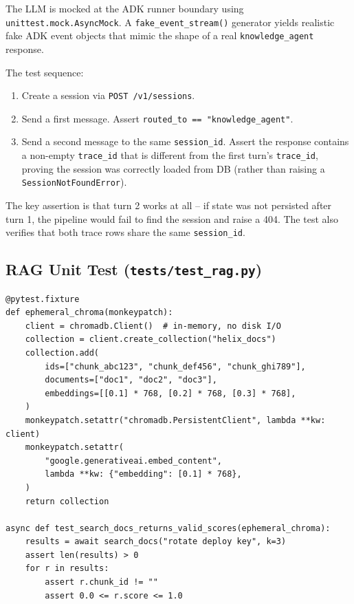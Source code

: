 \documentclass[12pt,a4paper]{article}
\begin{document}
The LLM is mocked at the ADK runner boundary using \texttt{unittest.mock.AsyncMock}. A \texttt{fake\_event\_stream()} generator yields realistic fake ADK event objects that mimic the shape of a real \texttt{knowledge\_agent} response.

The test sequence:

\begin{enumerate}[leftmargin=1.5em]
  \item Create a session via \texttt{POST /v1/sessions}.
  \item Send a first message. Assert \texttt{routed\_to == "knowledge\_agent"}.
  \item Send a second message to the same \texttt{session\_id}. Assert the response contains a non-empty \texttt{trace\_id} that is different from the first turn's \texttt{trace\_id}, proving the session was correctly loaded from DB (rather than raising a \texttt{SessionNotFoundError}).
\end{enumerate}

The key assertion is that turn 2 works at all -- if state was not persisted after turn 1, the pipeline would fail to find the session and raise a 404. The test also verifies that both trace rows share the same \texttt{session\_id}.

\subsection{RAG Unit Test (\texttt{tests/test\_rag.py})}

\begin{lstlisting}[style=python]
@pytest.fixture
def ephemeral_chroma(monkeypatch):
    client = chromadb.Client()  # in-memory, no disk I/O
    collection = client.create_collection("helix_docs")
    collection.add(
        ids=["chunk_abc123", "chunk_def456", "chunk_ghi789"],
        documents=["doc1", "doc2", "doc3"],
        embeddings=[[0.1] * 768, [0.2] * 768, [0.3] * 768],
    )
    monkeypatch.setattr("chromadb.PersistentClient", lambda **kw: client)
    monkeypatch.setattr(
        "google.generativeai.embed_content",
        lambda **kw: {"embedding": [0.1] * 768},
    )
    return collection

async def test_search_docs_returns_valid_scores(ephemeral_chroma):
    results = await search_docs("rotate deploy key", k=3)
    assert len(results) > 0
    for r in results:
        assert r.chunk_id != ""
        assert 0.0 <= r.score <= 1.0
\end{lstlisting}
\end{document}

